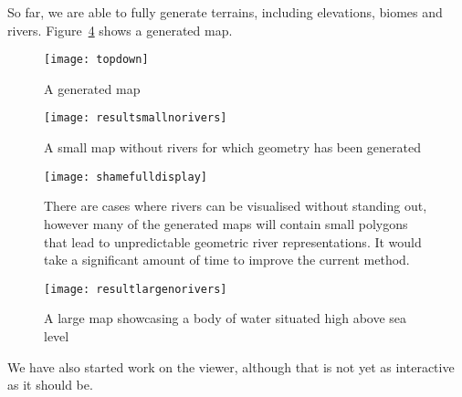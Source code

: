 
So far, we are able to fully generate terrains, including elevations, biomes and rivers.
Figure~\ref{fig:generator} shows a generated map.

\begin{figure}[H]
	\centering
	\texttt{[image: topdown]}
	\caption{A generated map}
	\label{fig:generator}
\end{figure}

\begin{figure}[H]
	\centering
	\texttt{[image: resultsmallnorivers]}
	\caption{A small map without rivers for which geometry has been generated}
	\label{fig:generator}
\end{figure}

\begin{figure}[H]
	\centering
	\texttt{[image: shamefulldisplay]}
	\caption{There are cases where rivers can be visualised without standing out, however many of the generated maps will contain small polygons that lead to unpredictable geometric river representations. It would take a significant amount of time to improve the current method.}
	\label{fig:generator}
\end{figure}

\begin{figure}[H]
	\centering
	\texttt{[image: resultlargenorivers]}
	\caption{A large map showcasing a body of water situated high above sea level}
	\label{fig:generator}
\end{figure}

We have also started work on the viewer, although that is not yet as interactive as it should be.
